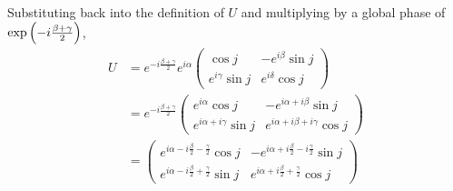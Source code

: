 %
Substituting back into the definition of $U$ and multiplying by a global phase of $\exp \left( -i\frac{\beta+\gamma}{2} \right)$,
\begin{align*}
U &= e^{-i\frac{\beta+\gamma}{2}} e^{i\alpha} \begin{pmatrix} \cos j & -e^{i\beta} \sin j \\ e^{i\gamma} \sin j & e^{i\delta} \cos j \end{pmatrix} \\
&= e^{-i\frac{\beta+\gamma}{2}} \begin{pmatrix} e^{i\alpha} \cos j & -e^{i\alpha+i\beta} \sin j \\ e^{i\alpha+i\gamma} \sin j & e^{i\alpha+i\beta+i\gamma} \cos j \end{pmatrix} \\
&= \begin{pmatrix} e^{i\alpha-i\frac{\beta}{2}-\frac{\gamma}{2}} \cos j & -e^{i\alpha+i\frac{\beta}{2}-i\frac{\gamma}{2}} \sin j \\ e^{i\alpha-i\frac{\beta}{2}+\frac{\gamma}{2}} \sin j & e^{i\alpha+i\frac{\beta}{2}+\frac{\gamma}{2}} \cos j \end{pmatrix} \\
\end{align*}
\endgroup

